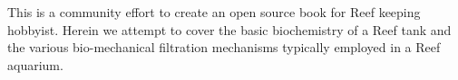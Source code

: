 %
%

\begin{dedication}
This is a community effort to create an open source book for Reef keeping
hobbyist. Herein we attempt to cover the basic biochemistry of a Reef tank and
the various bio-mechanical filtration mechanisms typically employed in a Reef
aquarium.
\end{dedication}
